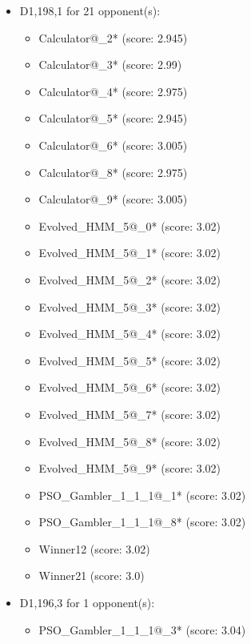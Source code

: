 \begin{appendices}
\begin{itemize}
    \item D1,198,1 for 21 opponent(s):
    \begin{multicols}{3}
         \begin{itemize}
            \item Calculator@\_2* (score: 2.945)
            \item Calculator@\_3* (score: 2.99)
            \item Calculator@\_4* (score: 2.975)
            \item Calculator@\_5* (score: 2.945)
            \item Calculator@\_6* (score: 3.005)
            \item Calculator@\_8* (score: 2.975)
            \item Calculator@\_9* (score: 3.005)
            \item Evolved\_HMM\_5@\_0* (score: 3.02)
            \item Evolved\_HMM\_5@\_1* (score: 3.02)
            \item Evolved\_HMM\_5@\_2* (score: 3.02)
            \item Evolved\_HMM\_5@\_3* (score: 3.02)
            \item Evolved\_HMM\_5@\_4* (score: 3.02)
            \item Evolved\_HMM\_5@\_5* (score: 3.02)
            \item Evolved\_HMM\_5@\_6* (score: 3.02)
            \item Evolved\_HMM\_5@\_7* (score: 3.02)
            \item Evolved\_HMM\_5@\_8* (score: 3.02)
            \item Evolved\_HMM\_5@\_9* (score: 3.02)
            \item PSO\_Gambler\_1\_1\_1@\_1* (score: 3.02)
            \item PSO\_Gambler\_1\_1\_1@\_8* (score: 3.02)
            \item Winner12 (score: 3.02)
            \item Winner21 (score: 3.0)
        \end{itemize}
     \end{multicols}
     
    \item D1,196,3 for 1 opponent(s):
    \begin{multicols}{3}
         \begin{itemize}
            \item PSO\_Gambler\_1\_1\_1@\_3* (score: 3.04)
        \end{itemize}
     \end{multicols}
     

\end{itemize}
\end{appendices}
